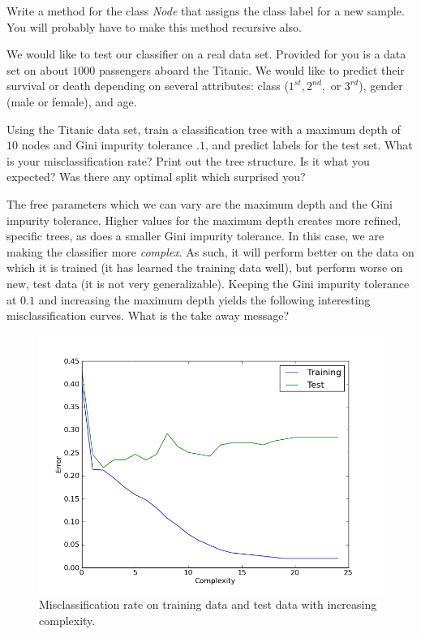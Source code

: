 \begin{problem}
Write a method for the class \emph{Node} that assigns the class label for a new sample. You will probably have to make this method recursive also.
\end{problem}

We would like to test our classifier on a real data set. Provided for you is a data set on about $1000$ passengers aboard the Titanic. We would like to predict their survival or death depending on several attributes: class ($1^{st}, 2^{nd},$ or $3^{rd}$), gender (male or female), and age.

\begin{problem}
Using the Titanic data set, train a classification tree with a maximum depth of $10$ nodes and Gini impurity tolerance $.1$, and predict labels for the test set. What is your misclassification rate? Print out the tree structure. Is it what you expected? Was there any optimal split which surprised you?
\end{problem}

The free parameters which we can vary are the maximum depth and the Gini impurity tolerance. Higher values for the maximum depth creates more refined, specific trees, as does a smaller Gini impurity tolerance. In this case, we are making the classifier more \emph{complex}. As such, it will perform better on the data on which it is trained (it has learned the training data well), but perform worse on new, test data (it is not very generalizable). Keeping the Gini impurity tolerance at $0.1$ and increasing the maximum depth yields the following interesting misclassification curves. What is the take away message?

\begin{figure}
\centering
\includegraphics[width=\textwidth]{complexity.png}
\caption{Misclassification rate on training data and test data with increasing complexity.}
\end{figure}
